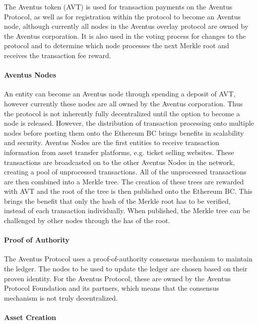 The Aventus token (AVT) is used for transaction payments on the Aventus Protocol, as well as for registration within the protocol to become an Aventus node, although currently all nodes in the Aventus overlay protocol are owned by the Aventus corporation. It is also used in the voting process for changes to the protocol and to determine which node processes the next Merkle root and receives the transaction fee reward.

\paragraph{Aventus Nodes}\label{subsection:aventus nodes}

 An entity can become an Aventus node through spending a deposit of AVT, however currently these nodes are all owned by the Aventus corporation. Thus the protocol is not inherently fully decentralized until the option to become a node is released. However, the distribution of transaction processing onto multiple nodes before posting them onto the Ethereum BC brings benefits in scalability and security.
 Aventus Nodes are the first entities to receive transaction information from asset transfer platforms, e.g. ticket selling websites. These transactions are broadcasted on to the other Aventus Nodes in the network, creating a pool of unprocessed transactions. All of the unprocessed transactions are then combined into a Merkle tree. The creation of these trees are rewarded with AVT and the root of the tree is then published onto the Ethereum BC. This brings the benefit that only the hash of the Merkle root has to be verified, instead of each transaction individually. When published, the Merkle tree can be challenged by other nodes through the has of the root.

\paragraph{Proof of Authority}

The Aventus Protocol uses a proof-of-authority consensus mechanism to maintain the ledger. The nodes to be used to update the ledger are chosen based on their proven identity. For the Aventus Protocol, these are owned by the Aventus Protocol Foundation and its partners, which means that the consensus mechanism is not truly decentralized. 

\paragraph{Asset Creation}

